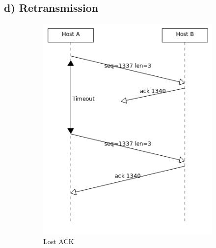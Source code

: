 \documentclass[a4paper, 11 pt, article, accentcolor=tud7b]{tudreport}
\begin{document}
	\subsection*{d) Retransmission}
	\begin{figure}[h]
    \begin{subfigure}[b]{0.3\textwidth}
      \includegraphics[width=\textwidth]{retrans1.png}
      \caption{Lost ACK}
      \label{fig:1}
    \end{subfigure}
    \begin{subfigure}[b]{0.3\textwidth}

\end{subfigure}
\end{figure}
\end{document}
